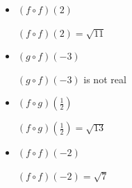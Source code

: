\documentclass{ximera}
\begin{document}
\begin{question}
\begin{problem}
\begin{itemize}
\item  $(f \circ f)(2)$

\begin{solution}
    $(f \circ f)(2) = \sqrt{11}$
\end{solution}

\item  $(g\circ f)(-3)$ 

\begin{solution}
    $(g\circ f)(-3)$ is not real
\end{solution}

\item  $(f\circ g)\left(\frac{1}{2}\right)$

\begin{solution}
    $(f\circ g)\left(\frac{1}{2}\right) = \sqrt{13}$
\end{solution}

\item  $(f \circ f)(-2)$

\begin{solution}
     $(f \circ f)(-2) = \sqrt{7}$
\end{solution}

\end{itemize}

\end{problem}

\end{question}
\end{document}
